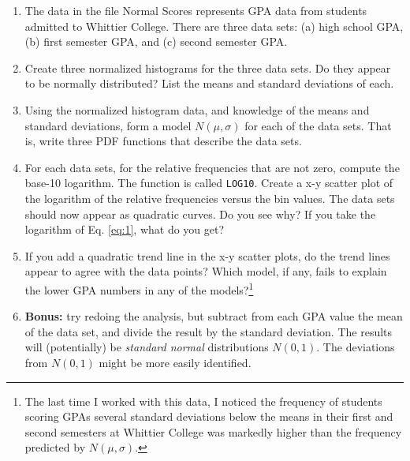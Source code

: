 \documentclass{article}
\begin{document}
\begin{enumerate}
\item The data in the file Normal Scores represents GPA data from students admitted to Whittier College.  There are three data sets: (a) high school GPA, (b) first semester GPA, and (c) second semester GPA.
\item Create three normalized histograms for the three data sets.  Do they appear to be normally distributed?  List the means and standard deviations of each.
\item Using the normalized histogram data, and knowledge of the means and standard deviations, form a model $N(\mu,\sigma)$ for each of the data sets.  That is, write three PDF functions that describe the data sets.
\item For each data sets, for the relative frequencies that are not zero, compute the base-10 logarithm.  The function is called \verb+LOG10+.  Create a x-y scatter plot of the logarithm of the relative frequencies versus the bin values.  The data sets should now appear as quadratic curves.  Do you see why?  If you take the logarithm of Eq. \ref{eq:1}, what do you get?
\item If you add a quadratic trend line in the x-y scatter plots, do the trend lines appear to agree with the data points?  Which model, if any, fails to explain the lower GPA numbers in any of the models?\footnote{The last time I worked with this data, I noticed the frequency of students scoring GPAs several standard deviations below the means in their first and second semesters at Whittier College was markedly higher than the frequency predicted by $N(\mu,\sigma)$.}
\item \textbf{Bonus:} try redoing the analysis, but subtract from each GPA value the mean of the data set, and divide the result by the standard deviation.  The results will (potentially) be \textit{standard normal} distributions $N(0,1)$.  The deviations from $N(0,1)$ might be more easily identified.
\end{enumerate}
\end{document}

